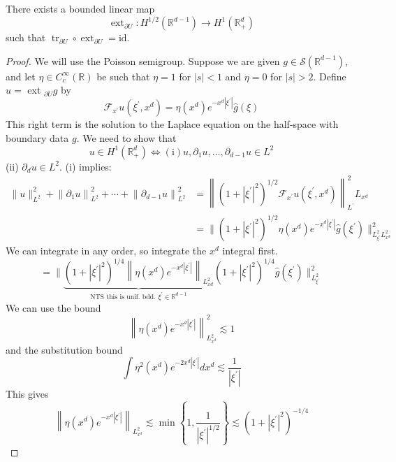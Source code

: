\begin{theorem}
There exists a bounded linear map
$$
\operatorname{ext}_{\partial U}: H^{1 / 2}\left(\mathbb{R}^{d-1}\right) \rightarrow H^{1}\left(\mathbb{R}_{+}^{d}\right)
$$
such that $\operatorname{tr}_{\partial U} \circ \operatorname{ext}_{\partial U}=\mathrm{id}$.
\end{theorem}
\begin{proof}
We will use the Poisson semigroup. Suppose we are given $g \in \mathcal{S}\left(\mathbb{R}^{d-1}\right)$, and let $\eta \in C_{c}^{\infty}(\mathbb{R})$ be such that $\eta=1$ for $|s|<1$ and $\eta=0$ for $|s|>2$. Define $u=$ ext $_{\partial U} g$ by
$$
\mathcal{F}_{x^{\prime}} u\left(\xi^{\prime}, x^{d}\right)=\eta\left(x^{d}\right) e^{-x^{d}\left|\xi^{\prime}\right|} \widehat{g}(\xi)
$$
This right term is the solution to the Laplace equation on the half-space with boundary data $g$.
We need to show that
$$
u \in H^{1}\left(\mathbb{R}_{+}^{d}\right) \Longleftrightarrow(\mathrm{i}) u, \partial_{1} u, \ldots, \partial_{d-1} u \in L^{2}
$$
(ii) $\partial_{d} u \in L^{2}$.
(i) implies:
$$
\begin{aligned}
\|u\|_{L^{2}}^{2}+\left\|\partial_{1} u\right\|_{L^{2}}^{2}+\cdots+\left\|\partial_{d-1} u\right\|_{L^{2}}^{2} &=\left\|\left(1+\left|\xi^{\prime}\right|^{2}\right)^{1 / 2} \mathcal{F}_{x^{\prime}} u\left(\xi^{\prime}, x^{d}\right)\right\|_{L^{\prime}}^{2} L_{x^{d}} \\
&=\|\left(1+\left|\xi^{\prime}\right|^{2}\right)^{1 / 2} \eta\left(x^{d}\right) e^{-x^{d}\left|\xi^{\prime}\right| } \widehat{g}\left(\xi^{\prime}\right) \|_{L_{\xi^{\prime}}^{2} L_{x^{d}}^{2}}^{2}
\end{aligned}
$$
We can integrate in any order, so integrate the $x^{d}$ integral first.
$$
=\|\underbrace{\left(1+\left|\xi^{\prime}\right|^{2}\right)^{1 / 4}\left\|\eta\left(x^{d}\right) e^{-x^{d}\left|\xi^{\prime}\right|}\right\|_{L_{x d}^{2}}}_{\text {NTS this is unif. bdd. } \xi^{\prime} \in \mathbb{R}^{d-1}}\left(1+\left|\xi^{\prime}\right|^{2}\right)^{1 / 4} \widehat{g}\left(\xi^{\prime}\right)\|_{L_{\xi^{\prime}}^{2}}^{2}
$$
We can use the bound
$$
\left\|\eta\left(x^{d}\right) e^{-x^{d}\left|\xi^{\prime}\right|}\right\|_{L_{x^{d}}^{2}}^{2} \lesssim 1
$$
and the substitution bound
$$
\int \eta^{2}\left(x^{d}\right) e^{-2 x^{d}\left|\xi^{\prime}\right|} d x^{d} \lesssim \frac{1}{\left|\xi^{\prime}\right|}
$$
This gives
$$
\left\|\eta\left(x^{d}\right) e^{-x^{d}\left|\xi^{\prime}\right|}\right\|_{L_{x^{d}}^{2}} \lesssim \min \left\{1, \frac{1}{\left|\xi^{\prime}\right|^{1 / 2}}\right\} \lesssim\left(1+\left|\xi^{\prime}\right|^2\right)^{-1 / 4}
$$
\end{proof}
